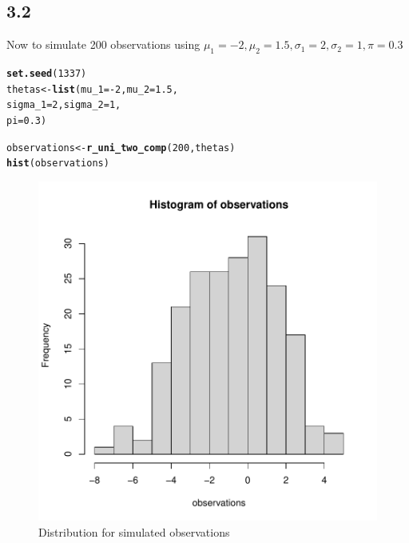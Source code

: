 \documentclass[10pt, a4paper, english]{article}\usepackage[]{graphicx}\usepackage[dvipsnames]{xcolor}
\makeatletter
\def\maxwidth{ %
  \ifdim\Gin@nat@width>\linewidth
    \linewidth
  \else
    \Gin@nat@width
  \fi
}
\newcommand{\hlnum}[1]{\textcolor[rgb]{0.686,0.059,0.569}{#1}}%
\newcommand{\hlopt}[1]{\textcolor[rgb]{0,0,0}{#1}}%
\newcommand{\hlstd}[1]{\textcolor[rgb]{0.345,0.345,0.345}{#1}}%
\newcommand{\hlkwb}[1]{\textcolor[rgb]{0.69,0.353,0.396}{#1}}%
\newcommand{\hlkwc}[1]{\textcolor[rgb]{0.333,0.667,0.333}{#1}}%
\newcommand{\hlkwd}[1]{\textcolor[rgb]{0.737,0.353,0.396}{\textbf{#1}}}%
\newenvironment{kframe}{%
 \def\at@end@of@kframe{}%
 \ifinner\ifhmode%
  \def\at@end@of@kframe{\end{minipage}}%
  \begin{minipage}{\columnwidth}%
 \fi\fi%
 \def\FrameCommand##1{\hskip\@totalleftmargin \hskip-\fboxsep
 \colorbox{shadecolor}{##1}\hskip-\fboxsep
     \hskip-\linewidth \hskip-\@totalleftmargin \hskip\columnwidth}%
 \MakeFramed {\advance\hsize-\width
   \@totalleftmargin\z@ \linewidth\hsize
   \@setminipage}}%
 {\par\unskip\endMakeFramed%
 \at@end@of@kframe}
\newenvironment{knitrout}{}{} %
\makeatother
\begin{document}
\subsection{3.2}
Now to simulate 200 observations using $\mu_1=-2, \mu_2 = 1.5, \sigma_1 = 2, \sigma_2=1, \pi=0.3$
\begin{knitrout}
\color{fgcolor}\begin{kframe}
\begin{alltt}
\hlkwd{set.seed}\hlstd{(}\hlnum{1337}\hlstd{)}
\hlstd{thetas} \hlkwb{<-}\hlkwd{list}\hlstd{(}\hlkwc{mu_1}\hlstd{=}\hlopt{-}\hlnum{2}\hlstd{,} \hlkwc{mu_2}\hlstd{=}\hlnum{1.5}\hlstd{,}
              \hlkwc{sigma_1}\hlstd{=}\hlnum{2}\hlstd{,} \hlkwc{sigma_2}\hlstd{=}\hlnum{1}\hlstd{,}
              \hlkwc{pi}\hlstd{=}\hlnum{0.3}\hlstd{)}

\hlstd{observations} \hlkwb{<-} \hlkwd{r_uni_two_comp}\hlstd{(}\hlnum{200}\hlstd{, thetas)}
\hlkwd{hist}\hlstd{(observations)}
\end{alltt}
\end{kframe}\begin{figure}
\includegraphics[width=\maxwidth]{figure/unnamed-chunk-24-1} \caption[Distribution for simulated observations]{Distribution for simulated observations}\label{fig:unnamed-chunk-24}
\end{figure}

\end{knitrout}
\end{document}

